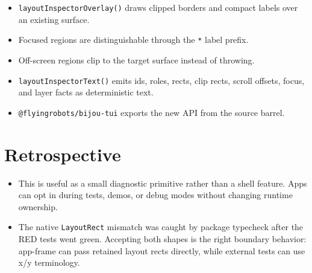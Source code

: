 \begin{itemize}
\tightlist
\item
  \texttt{l\allowbreak{}a\allowbreak{}y\allowbreak{}o\allowbreak{}u\allowbreak{}t\allowbreak{}I\allowbreak{}n\allowbreak{}s\allowbreak{}p\allowbreak{}e\allowbreak{}c\allowbreak{}t\allowbreak{}o\allowbreak{}r\allowbreak{}O\allowbreak{}v\allowbreak{}e\allowbreak{}r\allowbreak{}l\allowbreak{}a\allowbreak{}y\allowbreak{}(\allowbreak{})} draws clipped borders and compact labels over an existing surface.
\item
  Focused regions are distinguishable through the \texttt{*} label prefix.
\item
  Off-screen regions clip to the target surface instead of throwing.
\item
  \texttt{l\allowbreak{}a\allowbreak{}y\allowbreak{}o\allowbreak{}u\allowbreak{}t\allowbreak{}I\allowbreak{}n\allowbreak{}s\allowbreak{}p\allowbreak{}e\allowbreak{}c\allowbreak{}t\allowbreak{}o\allowbreak{}r\allowbreak{}T\allowbreak{}e\allowbreak{}x\allowbreak{}t\allowbreak{}(\allowbreak{})} emits ids, roles, rects, clip rects, scroll offsets, focus, and layer facts as deterministic text.
\item
  \texttt{@\allowbreak{}f\allowbreak{}l\allowbreak{}y\allowbreak{}i\allowbreak{}n\allowbreak{}g\allowbreak{}r\allowbreak{}o\allowbreak{}b\allowbreak{}o\allowbreak{}t\allowbreak{}s\allowbreak{}/\allowbreak{}b\allowbreak{}i\allowbreak{}j\allowbreak{}o\allowbreak{}u\allowbreak{}-\allowbreak{}t\allowbreak{}u\allowbreak{}i} exports the new API from the source barrel.
\end{itemize}

\section{Retrospective}\label{record-122-retrospective}

\begin{itemize}
\tightlist
\item
  This is useful as a small diagnostic primitive rather than a shell feature. Apps can opt in during tests, demos, or debug modes without changing runtime ownership.
\item
  The native \texttt{L\allowbreak{}a\allowbreak{}y\allowbreak{}o\allowbreak{}u\allowbreak{}t\allowbreak{}R\allowbreak{}e\allowbreak{}c\allowbreak{}t} mismatch was caught by package typecheck after the RED tests went green. Accepting both shapes is the right boundary behavior: app-frame can pass retained layout rects directly, while external tests can use x/y terminology.
\end{itemize}

